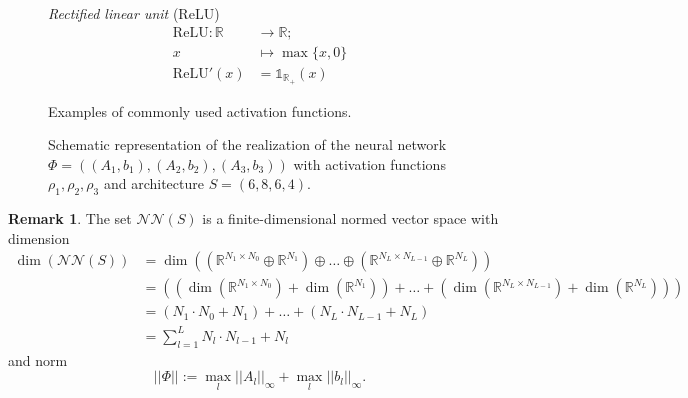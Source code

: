\documentclass[11pt,titlepage]{article}
\newcommand{\R}{\mathbb{R}} %
\newcommand{\abs}[1]{{\left| #1 \right|}}
\theoremstyle{definition}
\newtheorem{remark}[theorem]{Remark}
\theoremstyle{remark}
\begin{document}
\begin{figure}[!h]
\begin{mdframed}[style = inner]
{			\begin{minipage}[m]{0.31\textwidth}
				\textsl{Rectified \hspace{-0.1cm} linear \hspace{-0.1cm} unit}\hspace{-0.1cm} (ReLU)\\[-5ex]
				\begin{align*}
					\mathrm{ReLU}:\R&\to\R;\\[0.9ex]
					x&\mapsto \max\{x, 0\}\\[1.4ex]
					\mathrm{ReLU}'(x) &= \mathds{1}_{\R_+}(x)
				\end{align*}
			\end{minipage}
		}	
		\end{mdframed}
		\vspace{-3ex}
		\caption{Examples of commonly used activation functions.}\label{Abb. exp activation functions}	
	\end{figure}
	\newpage
	\begin{figure}[!h]
		\caption{Schematic representation of the realization of the neural network 
			$\Phi = ((A_1, b_1), (A_2, b_2), (A_3, b_3))$ with activation 
			functions $\rho_1, \rho_2, \rho_3$ and architecture 
			$S = (6, 8, 6, 4)$.} \label{Abb. neural network}
	\end{figure} 
	
	\begin{remark}
		The set $\mathcal{N}\mathcal{N}(S)$ is a finite-dimensional normed vector space with dimension
		\begin{align*}
			\dim(\mathcal{N}\mathcal{N}(S))&=\dim\left(\left(
			\mathbb{R}^{N_{1}\times N_0}\oplus\mathbb{R}^{N_1}\right)
			\oplus\ldots\oplus\left(\mathbb{R}^{N_{L}\times N_{L-1}}
			\oplus\mathbb{R}^{N_L}\right)\right)\\
			&=\left(\left(
			\dim\left(\mathbb{R}^{N_{1}\times N_0}\right)+\dim\left(\mathbb{R}^{N_1}\right)
			\right)
			+\ldots+\left(\dim\left(\mathbb{R}^{N_{L}\times N_{L-1}}
			\right)+\dim\left(\mathbb{R}^{N_L}\right)\right)\right)\\
			&=(N_1\cdot N_0+N_1)+\ldots+(N_{L}\cdot N_{L-1}+N_L)\\
			&=\sum_{l=1}^L N_{l}\cdot N_{l-1}+N_l
		\end{align*}
		and norm 
		\[\abs{\abs{\Phi}}:=\max_l \abs{\abs{A_l}}_{\infty}+
		\max_l \abs{\abs{b_l}}_{\infty}.\]
	\end{remark}
	
\end{document}
